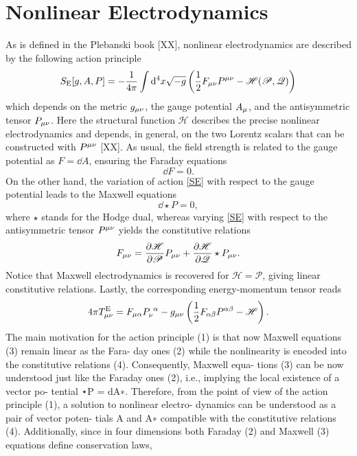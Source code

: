 \section{Nonlinear Electrodynamics}
As is defined in the Plebanski book [XX], nonlinear electrodynamics are described by the following action principle
\begin{equation}\label{SE}
  S_{\rm E}[g,A,P]=-\frac{1}{4\pi }\int\dd^4 x\sqrt{-g}\left(\frac{1}{2}F_{\mu\nu }P^{\mu\nu }-\mathscr{H}(\mathscr{P},\mathscr{Q})\right)
\end{equation}
which depends on the metric $g_{\mu\nu }$, the gauge potential $A_\mu$, and the antisymmetric tensor $P_{\mu\nu }$. Here the structural function $\mathscr{H}$ describes the precise nonlinear electrodynamics and depends, in general, on the two Lorentz scalars that can be constructed with $P^{\mu\nu }$ [XX]. As usual, the field strength is related to the gauge potential as $F=\dd A$, ensuring the Faraday equations
\begin{equation}
  \dd F=0.
\end{equation}
On the other hand, the variation of action \eqref{SE} with respect to the gauge potential leads to the Maxwell equations
\begin{equation}
	\dd \star P=0,
\end{equation}
where $\star$ stands for the Hodge dual, whereas varying \eqref{SE} with respect to the antisymmetric tensor $P^{\mu\nu }$ yields the constitutive relations
\begin{equation}
  F_{\mu\nu }=\pdv{\mathscr{H}}{\mathscr{P}}P_{\mu\nu }+\pdv{\mathscr{H}}{\mathscr{Q}}\star P_{\mu\nu }.
\end{equation}
Notice that Maxwell electrodynamics is recovered for $\mathscr{H}=\mathscr{P}$, giving linear constitutive relations. Lastly, the corresponding energy-momentum tensor reads
\begin{equation}
  4\pi T_{\mu\nu }^{\rm E}=F_{\mu\alpha }P_{\nu }^{~\alpha }-g_{\mu\nu }\left(\frac{1}{2}F_{\alpha\beta }P^{\alpha\beta }-\mathscr{H}\right). 
\end{equation}
The main motivation for the action principle (1) is that now Maxwell equations (3) remain linear as the Fara- day ones (2) while the nonlinearity is encoded into the constitutive relations (4). Consequently, Maxwell equa- tions (3) can be now understood just like the Faraday ones (2), i.e., implying the local existence of a vector po- tential ⋆P = dA∗. Therefore, from the point of view of the action principle (1), a solution to nonlinear electro- dynamics can be understood as a pair of vector poten- tials A and A∗ compatible with the constitutive relations (4). Additionally, since in four dimensions both Faraday (2) and Maxwell (3) equations define conservation laws,






